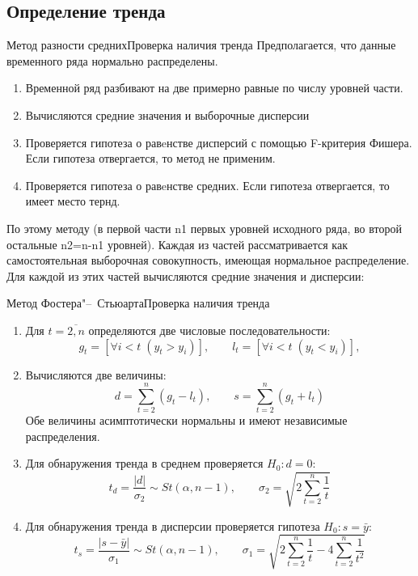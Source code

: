 \documentclass[10pt,pdf,utf8,hyperref={unicode},aspectratio=169]{beamer}
\begin{document}
\subsection{Определение тренда}
\begin{frame}{Метод  разности средних}{Проверка наличия тренда}
	Предполагается, что данные временного ряда нормально распределены.
	\begin{enumerate}
		\item Временной ряд разбивают на две примерно равные по числу уровней части.
		\item  Вычисляются средние значения и выборочные дисперсии 
		\item Проверяется гипотеза о равeнстве дисперсий с помощью F-критерия Фишера. Если гипотеза отвергается, то метод не применим.
		\item Проверяется гипотеза о равeнстве средних. Если гипотеза отвергается, то имеет место тернд.
	\end{enumerate}
	По этому методу  (в первой части
n1 первых уровней исходного ряда, во второй остальные n2=n-n1 уровней).
Каждая из частей рассматривается как самостоятельная
выборочная
совокупность, имеющая нормальное распределение. Для каждой из этих частей
вычисляются средние значения и дисперсии:
\end{frame}

\begin{frame}{Метод Фостера"--~Стьюарта}{Проверка наличия тренда}
	\begin{enumerate}
		\item Для $t= \overline{2,n}$ определяются две числовые последовательности:
		$$
			g_t = [\forall i<t\; (y_t > y_i)], 
			\qquad
			l_t = [\forall i<t\; (y_t < y_i)], 
		$$

		\item  Вычисляются две величины:
		$$
		d = \sum_{t=2}^n (g_t-l_t),\qquad
		s = \sum_{t=2}^n (g_t+l_t)
		$$
		Обе величины асимптотически нормальны и имеют независимые
		распределения.
		\item Для обнаружения тренда в среднем проверяется $H_0\colon d=0$:
		$$
		t_d = \frac{|d|}{\sigma_2}\sim St(\alpha,n-1),
		 \qquad 
		 \sigma_2 = \sqrt{2\sum_{t=2}^n \frac{1}{t}}
		$$
		\item Для обнаружения тренда в дисперсии проверяется гипотеза $H_0\colon s=\bar{y}$:
		$$
		t_s = \frac{|s-\bar{y}|}{\sigma_1}\sim St(\alpha,n-1),
		 \qquad 
		 \sigma_1 = \sqrt{2\sum_{t=2}^n \frac{1}{t}-4\sum_{t=2}^n \frac{1}{t^2}}
		$$
	\end{enumerate}
\end{frame}
\end{document}
